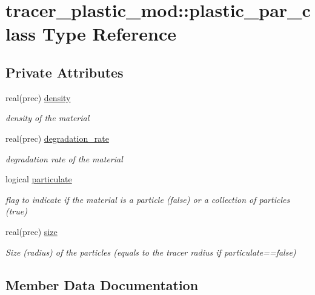 \hypertarget{structtracer__plastic__mod_1_1plastic__par__class}{}\section{tracer\+\_\+plastic\+\_\+mod\+:\+:plastic\+\_\+par\+\_\+class Type Reference}
\label{structtracer__plastic__mod_1_1plastic__par__class}
\subsection*{Private Attributes}
\begin{DoxyCompactItemize}
\item 
real(prec) \hyperlink{structtracer__plastic__mod_1_1plastic__par__class_af2f2bccb38cd0cd010f86091e36e8f3d}{density}
\begin{DoxyCompactList}\small\item\em density of the material \end{DoxyCompactList}\item 
real(prec) \hyperlink{structtracer__plastic__mod_1_1plastic__par__class_ae693d6112d2600408a274273d53c397e}{degradation\+\_\+rate}
\begin{DoxyCompactList}\small\item\em degradation rate of the material \end{DoxyCompactList}\item 
logical \hyperlink{structtracer__plastic__mod_1_1plastic__par__class_afbec8826947883ba3d3c5bc29759a80c}{particulate}
\begin{DoxyCompactList}\small\item\em flag to indicate if the material is a particle (false) or a collection of particles (true) \end{DoxyCompactList}\item 
real(prec) \hyperlink{structtracer__plastic__mod_1_1plastic__par__class_a4436f491c11ebd046b3a74987ff71eee}{size}
\begin{DoxyCompactList}\small\item\em Size (radius) of the particles (equals to the tracer radius if particulate==false) \end{DoxyCompactList}\end{DoxyCompactItemize}


\subsection{Member Data Documentation}
\mbox{\label{structtracer__plastic__mod_1_1plastic__par__class_ae693d6112d2600408a274273d53c397e}} 
